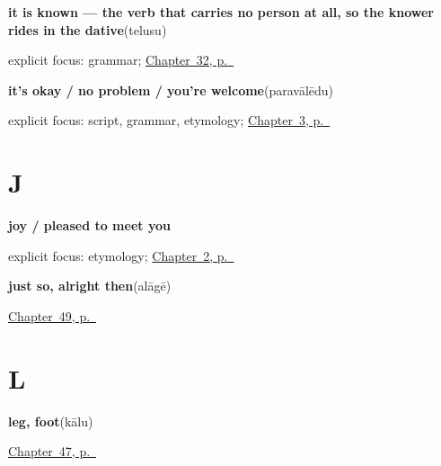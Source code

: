 \noindent\begin{minipage}[t]{\linewidth}
\raggedright
\textbf{it is known — the verb that carries no person at all, so the knower rides in the dative}\enspace\emph{}\enspace(telusu)\par
\footnotesize explicit focus: grammar; \hyperref[ch:te-core-verbs]{Chapter~32, p.~\pageref*{ch:te-core-verbs}}
\end{minipage}\par\smallskip

\noindent\begin{minipage}[t]{\linewidth}
\raggedright
\textbf{it's okay / no problem / you're welcome}\enspace\emph{}\enspace(paravālēdu)\par
\footnotesize explicit focus: script, grammar, etymology; \hyperref[ch:responding]{Chapter~3, p.~\pageref*{ch:responding}}
\end{minipage}\par\smallskip

\section*{J}

\noindent\begin{minipage}[t]{\linewidth}
\raggedright
\textbf{joy / pleased to meet you}\enspace\emph{}\par
\footnotesize explicit focus: etymology; \hyperref[ch:introductions]{Chapter~2, p.~\pageref*{ch:introductions}}
\end{minipage}\par\smallskip

\noindent\begin{minipage}[t]{\linewidth}
\raggedright
\textbf{just so, alright then}\enspace\emph{}\enspace(alāgē)\par
\footnotesize \hyperref[ch:te-replies]{Chapter~49, p.~\pageref*{ch:te-replies}}
\end{minipage}\par\smallskip

\section*{L}

\noindent\begin{minipage}[t]{\linewidth}
\raggedright
\textbf{leg, foot}\enspace\emph{}\enspace(kālu)\par
\footnotesize \hyperref[ch:te-body-more]{Chapter~47, p.~\pageref*{ch:te-body-more}}
\end{minipage}\par\smallskip

